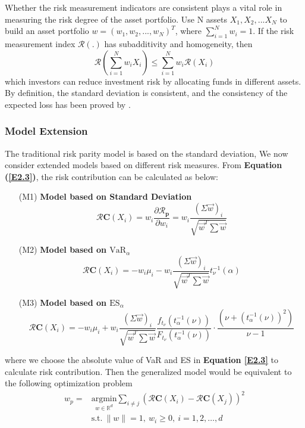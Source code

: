\noindent Whether the risk measurement indicators are consistent plays a vital role in measuring the risk degree of the asset portfolio. Use N assets $X_{1}, X_{2},...X_{N}$ to build an asset portfolio $w=(w_{1},w_{2},...,w_{N} )^T$, where $\sum_{i=1}^N w_i=1$. If the risk measurement index $\mathcal{R}(.)$ has subadditivity and homogeneity, then
$$
    \mathcal{R}\left(\sum_{i=1}^N w_i X_i\right) \leq \sum_{i=1}^N w_i \mathcal{R}\left(X_i\right)
$$
which investors can reduce investment risk by allocating funds in different assets. By definition, the standard deviation is consistent, and the consistency of the expected loss has been proved by \cite{TD2002}.


\subsubsection{Model Extension}
The traditional risk parity model is based on the standard deviation, We now consider extended models based on different risk measures. From \textbf{Equation (\ref{E2.3})}, the risk contribution can be calculated as below:
\begin{itemize}
    \item[(M1)] \textbf{Model based on Standard Deviation}
    \begin{equation}
     \boldsymbol{\mathcal{R}}\boldsymbol{C}\left(X_i\right)=w_i \frac{\partial \boldsymbol{\mathcal{R}}_{\boldsymbol{p}}}{\partial w_i}=w_i \frac{(\Sigma \vec{w})_i}{\sqrt{\vec{w}^T \sum \vec{w}}}   
    \end{equation}

    \item[(M2)]\textbf{Model based on $\text{VaR}_{\alpha}$}
    \begin{equation}
     \boldsymbol{\mathcal{R}}\boldsymbol{C}\left(X_i\right)=-w_i\mu_{i} - w_i \frac{(\Sigma \vec{w})_i}{\sqrt{\vec{w}^T \sum \vec{w}}}t_{\nu}^{-1}(\alpha)  
    \end{equation}
    \item[(M3)]\textbf{Model based on $\text{ES}_{\alpha}$}
    \begin{equation}
     \boldsymbol{\mathcal{R}}\boldsymbol{C}\left(X_i\right)=-w_i\mu_{i} + w_i \frac{(\Sigma \vec{w})_i}{\sqrt{\vec{w}^T \sum \vec{w}}}\frac{f_{t_{\nu}}\left(t^{-1}_\alpha(\nu)\right)}{F_{t_{\nu}}\left(t^{-1}_\alpha(\nu)\right)} \cdot \frac{\left(\nu+(t^{-1}_\alpha(\nu))^2\right)}{\nu-1} 
    \end{equation}
\end{itemize}
where we choose the absolute value of VaR and ES in \textbf{Equation \ref{E2.3}} to calculate risk contribution. Then the generalized model would be equivalent to the following optimization problem
\begin{equation}
\begin{aligned}
 w_p=&\underset{w \in \mathbb{R}^d}{\text{argmin}} \sum_{i \neq j} \left(\boldsymbol{\mathcal{R}}\boldsymbol{C}\left(X_i\right)-\boldsymbol{\mathcal{R}}\boldsymbol{C}\left(X_j\right)\right)^2\\
 & \text{s.t.} \: \|w\|=1,\: w_i\ge 0,\:i=1,2,\dots,d
\end{aligned}
\end{equation}



